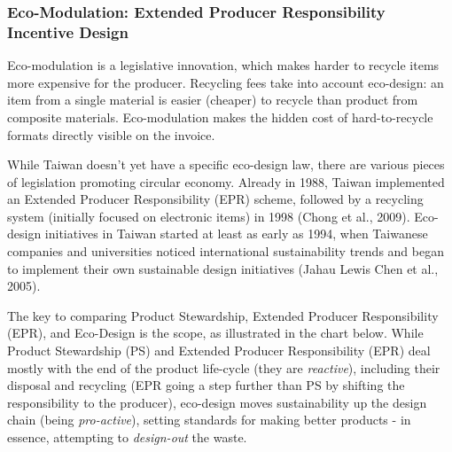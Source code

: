 \documentclass[
  12pt,
  letterpaper,
  DIV=11,
  numbers=noendperiod]{scrartcl}
\begin{document}
\subsubsection{Eco-Modulation: Extended Producer Responsibility
Incentive
Design}\label{eco-modulation-extended-producer-responsibility-incentive-design}

Eco-modulation is a legislative innovation, which makes harder to
recycle items more expensive for the producer. Recycling fees take into
account eco-design: an item from a single material is easier (cheaper)
to recycle than product from composite materials. Eco-modulation makes
the hidden cost of hard-to-recycle formats directly visible on the
invoice.

While Taiwan doesn't yet have a specific eco-design law, there are
various pieces of legislation promoting circular economy. Already in
1988, Taiwan implemented an Extended Producer Responsibility (EPR)
scheme, followed by a recycling system (initially focused on electronic
items) in 1998 (Chong et al., 2009). Eco-design initiatives in Taiwan
started at least as early as 1994, when Taiwanese companies and
universities noticed international sustainability trends and began to
implement their own sustainable design initiatives (Jahau Lewis Chen et
al., 2005).

The key to comparing Product Stewardship, Extended Producer
Responsibility (EPR), and Eco-Design is the scope, as illustrated in the
chart below. While Product Stewardship (PS) and Extended Producer
Responsibility (EPR) deal mostly with the end of the product life-cycle
(they are \emph{reactive}), including their disposal and recycling (EPR
going a step further than PS by shifting the responsibility to the
producer), eco-design moves sustainability up the design chain (being
\emph{pro-active}), setting standards for making better products - in
essence, attempting to \emph{design-out} the waste.
\end{document}
